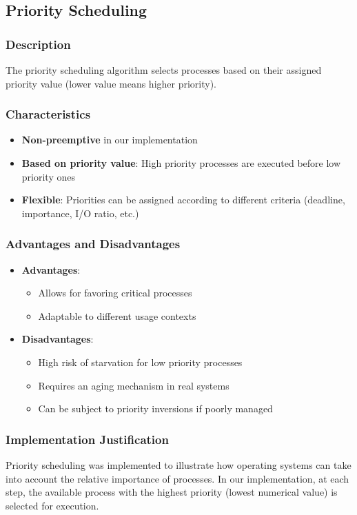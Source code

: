 \documentclass[12pt,a4paper]{article}
\begin{document}
\subsection{Priority Scheduling}
\subsubsection{Description}
The priority scheduling algorithm selects processes based on their assigned priority value (lower value means higher priority).

\subsubsection{Characteristics}
\begin{itemize}
    \item \textbf{Non-preemptive} in our implementation
    \item \textbf{Based on priority value}: High priority processes are executed before low priority ones
    \item \textbf{Flexible}: Priorities can be assigned according to different criteria (deadline, importance, I/O ratio, etc.)
\end{itemize}

\subsubsection{Advantages and Disadvantages}
\begin{itemize}
    \item \textbf{Advantages}:
    \begin{itemize}
        \item Allows for favoring critical processes
        \item Adaptable to different usage contexts
    \end{itemize}
    \item \textbf{Disadvantages}:
    \begin{itemize}
        \item High risk of starvation for low priority processes
        \item Requires an aging mechanism in real systems
        \item Can be subject to priority inversions if poorly managed
    \end{itemize}
\end{itemize}

\subsubsection{Implementation Justification}
Priority scheduling was implemented to illustrate how operating systems can take into account the relative importance of processes. In our implementation, at each step, the available process with the highest priority (lowest numerical value) is selected for execution.
\end{document}
